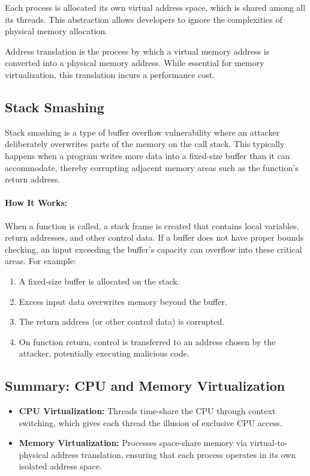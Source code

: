 \vspace{10px}
\begin{definition}
Each process is allocated its own virtual address space, which is shared among all its threads. This abstraction allows developers to ignore the complexities of physical memory allocation.
\end{definition}
\vspace{10px}
\begin{definition}
Address translation is the process by which a virtual memory address is converted into a physical memory address. While essential for memory virtualization, this translation incurs a performance cost.
\end{definition}

\subsection{Stack Smashing}
Stack smashing is a type of buffer overflow vulnerability where an attacker deliberately overwrites parts of the memory on the call stack. This typically happens when a program writes more data into a fixed-size buffer than it can accommodate, thereby corrupting adjacent memory areas such as the function's return address.

\paragraph{How It Works:}
When a function is called, a stack frame is created that contains local variables, return addresses, and other control data. If a buffer does not have proper bounds checking, an input exceeding the buffer's capacity can overflow into these critical areas. For example:
\begin{enumerate}
    \item A fixed-size buffer is allocated on the stack.
    \item Excess input data overwrites memory beyond the buffer.
    \item The return address (or other control data) is corrupted.
    \item On function return, control is transferred to an address chosen by the attacker, potentially executing malicious code.
\end{enumerate}
\subsection{Summary: CPU and Memory Virtualization}
\begin{itemize}
    \item \textbf{CPU Virtualization:} Threads time-share the CPU through context switching, which gives each thread the illusion of exclusive CPU access.
    \item \textbf{Memory Virtualization:} Processes space-share memory via virtual-to-physical address translation, ensuring that each process operates in its own isolated address space.
\end{itemize}

